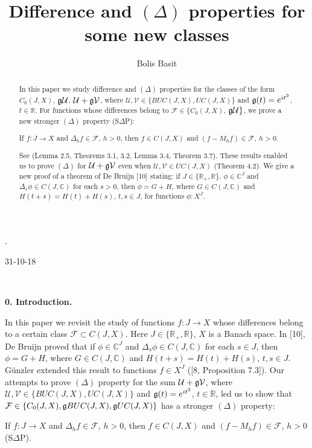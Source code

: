 \documentclass[10pt,onside,reqno]{amsart}
\newcommand{\Cdb}{\mbox{$\mathbb{C}$}}
\newcommand{\Rdb}{\mbox{$\mathbb{R}$}}
\newcommand{\F}{\mbox{${\mathcal F}$}}
\newcommand{\U}{\mbox{${\mathcal U}$}}
\newcommand{\V}{\mbox{${\mathcal V}$}}
\theoremstyle{remark}
\theoremstyle{definition}
\begin{document}
\title[Difference and $(\Delta)$ property] {Difference and $(\Delta)$ properties for some new classes}.
\author{Bolis Basit}
       \address {School of Math. Sciences, P.O. Box  28M,
       Monash University, Victoria 3800, Australia}

\begin{abstract}
{In this paper we study difference and $(\Delta)$ properties for the classes of the form $C_0(J,X)$,  $\frak {g} \U$,  $\U+\frak {g} \V$, where $\U, \V\in \{BUC(J,X), UC(J,X)\}$  and $\frak{g} (t)=e^{it^2}$, $t\in \mathbb{R}$. For functions whose differences belong to  $ \F \in\{C_0(J,X)$, $\frak {g} \U\}$,  we prove a new stronger $(\Delta)$ property (S$\Delta$P):


If $f: J\to X$ and $\Delta_h f \in \F$, $h > 0$, then $f\in C(J,X)$ and $(f-M_hf)\in \F$,  $h > 0$.


\noindent See  (Lemma 2.5, Theorems 3.1, 3.2, Lemma 3.4, Theorem 3.7).
  These results enabled us to prove $(\Delta)$ for   $\U+\frak {g} \V$ even when $\U, \V\in  UC(J,X) $ (Theorem 4.2).  We give a new proof of a theorem of De Bruijn [10] stating: if $J\in \{\Rdb_+, \Rdb\}$,  $\phi\in \Cdb^J$ and $\Delta_s \phi \in C(J,\Cdb)$ for each $s >0$, then  $\phi= G+H$, where $G \in C(J,\Cdb)$ and $H(t+s)=H(t)+H(s)$, $t,s\in J$, for functions $\phi: X^J  $.}
 \end{abstract}
\maketitle

31-10-18


\

\noindent\textbf{0.   Introduction.}

In this paper we revisit the study of functions $f: J\to X$  whose differences belong to a certain class  $\F \subset C(J,X)$. Here $J\in \{\Rdb_+,\Rdb\}$, $X$ is a Banach space. In [10],  De Bruijn  proved that if $\phi\in \Cdb^J$ and $\Delta_s \phi \in C(J,\Cdb)$ for each $s \in J$, then  $\phi= G+H$, where $G \in C(J,\Cdb)$ and $H(t+s)=H(t)+H(s)$, $t,s\in J$. G\"{unzler} extended this result to functions $f\in X^J$ ([8, Proposition 7.3]). Our attempts to prove $(\Delta)$ property for the sum  $\U+\frak {g} \V$, where $\U, \V\in \{BUC(J,X), UC(J,X)\}$ and $\frak{g} (t)=e^{it^2}$, $t\in \mathbb{R}$, led us  to show that $\F\in \{C_0(J,X), \frak{g}BUC(J,X), \frak{g} UC(J,X)\}$ has a stronger $(\Delta)$ property:

If $f: J\to X$ and $\Delta_h f \in \F$, $h > 0$, then $f\in C(J,X)$ and $(f-M_hf)\in \F$,  $h > 0$\quad (S$\Delta$P).
\end{document}
